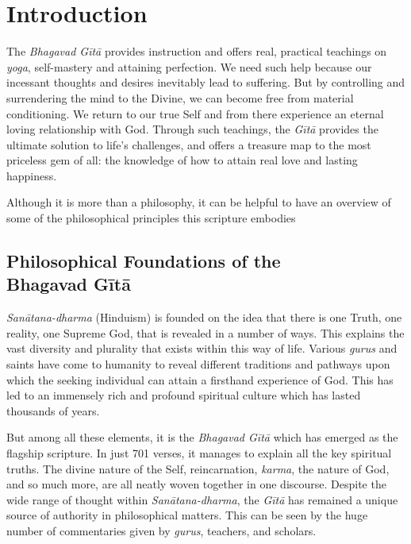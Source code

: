 \chapter{Introduction}\label{chap-introduction}

\bigskip

The \textit{Bhagavad Gītā} provides instruction and offers real, practical teachings on \textit{yoga}, self-mastery and attaining perfection. We need such help because our incessant thoughts and desires inevitably lead to suffering. But by controlling and surrendering the mind to the Divine, we can become free from material conditioning. We return to our true Self and from there experience an eternal loving relationship with God. Through such teachings, the \textit{Gītā} provides the ultimate solution to life’s challenges, and offers a treasure map to the most priceless gem of all: the knowledge of how to attain real love and lasting happiness.

Although it is more than a philosophy, it can be helpful to have an overview of some of the philosophical principles this scripture embodies

\section{Philosophical Foundations of the \\ Bhagavad Gītā}\label{sec-philosophical-foundations-of-the-bhagavad-gita}

\textit{Sanātana-dharma} (Hinduism) is founded on the idea that there is one Truth, one reality, one Supreme God, that is revealed in a number of ways. This explains the vast diversity and plurality that exists within this way of life. Various \textit{gurus} and saints have come to humanity to reveal different traditions and pathways upon which the seeking individual can attain a firsthand experience of God. This has led to an immensely rich and profound spiritual culture which has lasted thousands of years.

But among all these elements, it is the \textit{Bhagavad Gītā} which has emerged as the flagship scripture. In just 701 verses, it manages to explain all the key spiritual truths. The divine nature of the Self, reincarnation, \textit{karma}, the nature of God, and so much more, are all neatly woven together in one discourse. Despite the wide range of thought within \textit{Sanātana-dharma}, the \textit{Gītā} has remained a unique source of authority in philosophical matters. This can be seen by the huge number of commentaries given by \textit{gurus}, teachers, and scholars.

